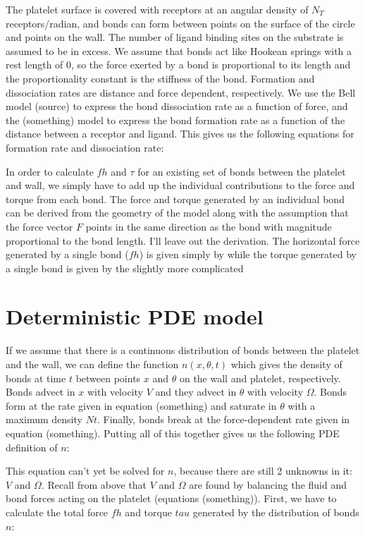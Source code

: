 The platelet surface is covered with receptors at an angular density
of $N_T$ receptors/radian, and bonds can form between points on the
surface of the circle and points on the wall. The number of ligand
binding sites on the substrate is assumed to be in excess. We assume
that bonds act like Hookean springs with a rest length of 0, so the
force exerted by a bond is proportional to its length and the
proportionality constant is the stiffness of the bond. Formation and
dissociation rates are distance and force dependent, respectively. We
use the Bell model (source) to express the bond dissociation rate as a
function of force, and the (something) model to express the bond
formation rate as a function of the distance between a receptor and
ligand. This gives us the following equations for formation rate and
dissociation rate:

In order to calculate $fh$ and $\tau$ for an existing set of bonds
between the platelet and wall, we simply have to add up the individual
contributions to the force and torque from each bond. The force and
torque generated by an individual bond can be derived from the
geometry of the model along with the assumption that the force vector
$F$ points in the same direction as the bond with magnitude
proportional to the bond length. I'll leave out the derivation. The
horizontal force generated by a single bond ($fh$) is given simply by
while the torque generated by a single bond is given by the slightly
more complicated

\section{Deterministic PDE model}
\label{sec:determ-pde-model}

If we assume that there is a continuous distribution of bonds between
the platelet and the wall, we can define the function $n(x, \theta,
t)$ which gives the density of bonds at time $t$ between points $x$
and $\theta$ on the wall and platelet, respectively. Bonds advect in
$x$ with velocity $V$ and they advect in $\theta$ with velocity
$\Omega$. Bonds form at the rate given in equation (something) and
saturate in $\theta$ with a maximum density $Nt$. Finally, bonds break
at the force-dependent rate given in equation (something). Putting all
of this together gives us the following PDE definition of $n$:

This equation can't yet be solved for $n$, because there are still 2
unknowns in it: $V$ and $\Omega$. Recall from above that $V$ and
$\Omega$ are found by balancing the fluid and bond forces acting on
the platelet (equations (something)). First, we have to calculate the
total force $fh$ and torque $tau$ generated by the distribution of
bonds $n$:

